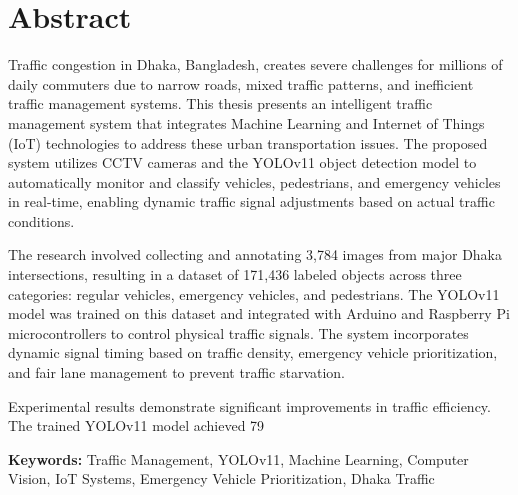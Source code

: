 \chapter*{Abstract}

Traffic congestion in Dhaka, Bangladesh, creates severe challenges for millions of daily commuters due to narrow roads, mixed traffic patterns, and inefficient traffic management systems. This thesis presents an intelligent traffic management system that integrates Machine Learning and Internet of Things (IoT) technologies to address these urban transportation issues. The proposed system utilizes CCTV cameras and the YOLOv11 object detection model to automatically monitor and classify vehicles, pedestrians, and emergency vehicles in real-time, enabling dynamic traffic signal adjustments based on actual traffic conditions.

The research involved collecting and annotating 3,784 images from major Dhaka intersections, resulting in a dataset of 171,436 labeled objects across three categories: regular vehicles, emergency vehicles, and pedestrians. The YOLOv11 model was trained on this dataset and integrated with Arduino and Raspberry Pi microcontrollers to control physical traffic signals. The system incorporates dynamic signal timing based on traffic density, emergency vehicle prioritization, and fair lane management to prevent traffic starvation.

Experimental results demonstrate significant improvements in traffic efficiency. The trained YOLOv11 model achieved 79%

\textbf{Keywords:} Traffic Management, YOLOv11, Machine Learning, Computer Vision, IoT Systems, Emergency Vehicle Prioritization, Dhaka Traffic

\newpage 